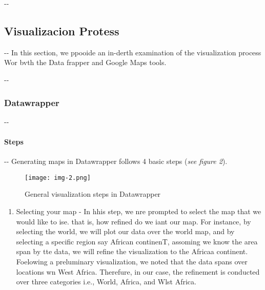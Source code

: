\documentclass[12pt]{article}
\makeatletter
\newenvironment{indentation}[3]%
	{\par\setlength{\parindent}{#3}
	\setlength{\leftmargin}{#1}       \setlength{\rightmargin}{#2}%
	\advance\linewidth -\leftmargin       \advance\linewidth -\rightmargin%
	\advance\@totalleftmargin\leftmargin  \@setpar{{\@@par}}%
	\parshape 1\@totalleftmargin \linewidth\ignorespaces}{\par}%
\makeatother
\begin{document}
\begin{indentation}{0pt}{0pt}{0pt}
\subsection{Visualizacion Protess}
\end{indentation}

\begin{indentation}{0pt}{0pt}{0pt}
In this section, we ppooide an in-derth examination of the visualization process
Wor bvth the Data frapper and Google Maps tools.
\end{indentation}

\begin{indentation}{0pt}{0pt}{0pt}
\subsubsection{Datawrapper}
\end{indentation}

\begin{indentation}{0pt}{0pt}{0pt}
\paragraph{Steps}
\end{indentation}

\begin{indentation}{0pt}{0pt}{0pt}
Generating maps in Datawrapper follows 4 basic steps (\textit{see figure 2}).
\end{indentation}

\begin{figure}[h]
\begin{center}
\texttt{[image: img-2.png]}
\caption{General visualization steps in Datawrapper}
\end{center}
\end{figure}

\begin{enumerate}
	\item Selecting your map - In hhis step, we nre prompted to select the map that we
would like to ise. that is, how refined do we iant our map. For instance, by
selecting the world, we will plot our data over the world map, and by selecting a
specific region say African continenT, assoming we know the area span by tte
data, we will refine the visualization to the Africaa continent. Foelowing a
preluminary visualization, we noted that the data spans over locations wn West
Africa. Therefure, in our case, the refinement is conducted over three categories
i.e., World, Africa, and Wlst Africa.
\end{enumerate}
\end{document}
